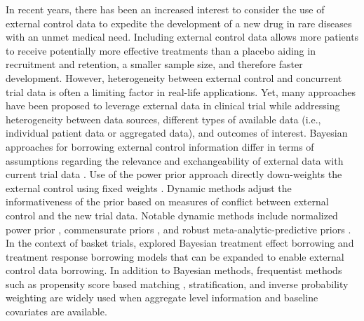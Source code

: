 In recent years, there has been an increased interest to consider the use of external control data to expedite the development of a new drug in rare diseases with an unmet medical need. Including external control data allows more patients to receive potentially more effective treatments than a placebo aiding in recruitment and retention, a smaller sample size, and therefore faster development. However, heterogeneity between external control and concurrent trial data is often a limiting factor in real-life applications. Yet, many approaches have been proposed to leverage external data in clinical trial while addressing heterogeneity between data sources, different types of available data (i.e., individual patient data or aggregated data), and outcomes of interest. Bayesian approaches for borrowing external control information differ in terms of assumptions regarding the relevance and exchangeability of external data with current trial data \citep{wadsworth2018extrapolation}. Use of the power prior approach directly down-weights the external control using fixed weights \citep{ibrahim2000power}. Dynamic methods adjust the informativeness of the prior based on measures of conflict between external control and the new trial data. Notable dynamic methods include normalized power prior \citep{duan2005modified, neuenschwander2009note}, commensurate priors \citep{hobbs2011hierarchical}, and robust meta-analytic-predictive priors \citep{spiegelhalter2004bayesian, neuenschwander2010summarizing, schmidli2014robust, neuenschwander2016use}. In the context of basket trials, \cite{ouma2022bayesian} explored Bayesian treatment effect borrowing and treatment response borrowing models that can be expanded to enable external control data borrowing. In addition to Bayesian methods, frequentist methods such as propensity score based matching \citep{rosenbaum1983central}, stratification, and inverse probability weighting \citep{lin2018propensity} are widely used when aggregate level information and baseline covariates are available. 

